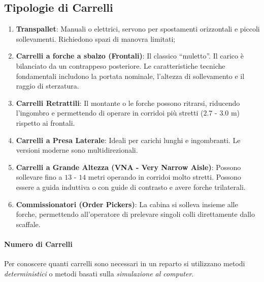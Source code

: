 \subsection{Tipologie di Carrelli}
\begin{enumerate}
    \item \textbf{Transpallet}: Manuali o elettrici, servono per spostamenti orizzontali e piccoli sollevamenti. Richiedono spazi di manovra limitati;
    \item \textbf{Carrelli a forche a sbalzo (Frontali)}: Il classico ``muletto''. Il carico è bilanciato da un contrappeso posteriore. Le caratteristiche tecniche fondamentali includono la portata nominale, l'altezza di sollevamento e il raggio di sterzatura.
    \item \textbf{Carrelli Retrattili}: Il montante o le forche possono ritrarsi, riducendo l'ingombro e permettendo di operare in corridoi più stretti ($ 2.7 $ - $ 3.0 $ m) rispetto ai frontali.
    \item \textbf{Carrelli a Presa Laterale}: Ideali per carichi lunghi e ingombranti. Le versioni moderne sono multidirezionali.
    \item \textbf{Carrelli a Grande Altezza (VNA - Very Narrow Aisle)}: Possono sollevare fino a $ 13 $ - $ 14 $ metri operando in corridoi molto stretti. Possono essere a guida induttiva o con guide di contrasto e avere forche trilaterali.
    \item \textbf{Commissionatori (Order Pickers)}: La cabina si solleva insieme alle forche, permettendo all'operatore di prelevare singoli colli direttamente dallo scaffale.
\end{enumerate}
%
\paragraph{Numero di Carrelli} Per conoscere quanti carrelli sono necessari in un reparto si utilizzano metodi \emph{deterministici} o metodi basati sulla \emph{simulazione al computer}.

